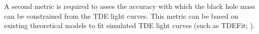A second metric is required to asses the accuracy with which the black
hole mass can be constrained from the TDE light curves. This metric can
be based on existing theoretical models to fit simulated TDE light
curves (such as TDEFit; \citealt{Guillochon2014}).

%
%
%
%
%
%
%
%
%
%
%
%
%
%
%

